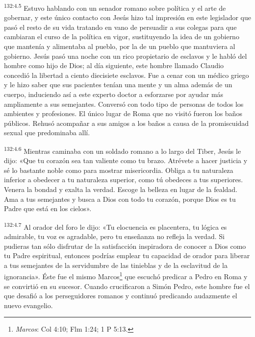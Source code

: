\par 
\textsuperscript{132:4.5} Estuvo hablando con un senador romano sobre política y el arte de gobernar, y este único contacto con Jesús hizo tal impresión en este legislador que pasó el resto de su vida tratando en vano de persuadir a sus colegas para que cambiaran el curso de la política en vigor, sustituyendo la idea de un gobierno que mantenía y alimentaba al pueblo, por la de un pueblo que mantuviera al gobierno. Jesús pasó una noche con un rico propietario de esclavos y le habló del hombre como hijo de Dios; al día siguiente, este hombre llamado Claudio concedió la libertad a ciento diecisiete esclavos. Fue a cenar con un médico griego y le hizo saber que sus pacientes tenían una mente y un alma además de un cuerpo, induciendo así a este experto doctor a esforzarse por ayudar más ampliamente a sus semejantes. Conversó con todo tipo de personas de todos los ambientes y profesiones. El único lugar de Roma que no visitó fueron los baños públicos. Rehusó acompañar a sus amigos a los baños a causa de la promiscuidad sexual que predominaba allí.

\par 
\textsuperscript{132:4.6} Mientras caminaba con un soldado romano a lo largo del Tiber, Jesús le dijo: «Que tu corazón sea tan valiente como tu brazo. Atrévete a hacer justicia y sé lo bastante noble como para mostrar misericordia. Obliga a tu naturaleza inferior a obedecer a tu naturaleza superior, como tú obedeces a tus superiores. Venera la bondad y exalta la verdad. Escoge la belleza en lugar de la fealdad. Ama a tus semejantes y busca a Dios con todo tu corazón, porque Dios es tu Padre que está en los cielos».

\par 
\textsuperscript{132:4.7} Al orador del foro le dijo: «Tu elocuencia es placentera, tu lógica es admirable, tu voz es agradable, pero tu enseñanza no refleja la verdad. Si pudieras tan sólo disfrutar de la satisfacción inspiradora de conocer a Dios como tu Padre espiritual, entonces podrías emplear tu capacidad de orador para liberar a tus semejantes de la servidumbre de las tinieblas y de la esclavitud de la ignorancia». Éste fue el mismo Marcos\footnote{\textit{Marcos}: Col 4:10; Flm 1:24; 1 P 5:13.} que escuchó predicar a Pedro en Roma y se convirtió en su sucesor. Cuando crucificaron a Simón Pedro, este hombre fue el que desafió a los perseguidores romanos y continuó predicando audazmente el nuevo evangelio.

